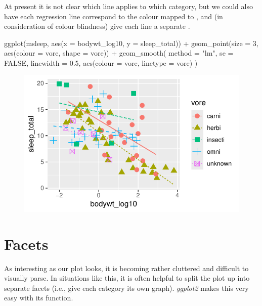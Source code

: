 At present it is not clear which line applies to which category, but we could also have each regression line correspond to the colour mapped to , and (in consideration of colour blindness) give each line a separate .

\begin{inR}
ggplot(msleep, aes(x = bodywt_log10, y = sleep_total)) +
  geom_point(size = 3, aes(colour = vore, shape = vore)) +
  geom_smooth(
    method = "lm",
    se = FALSE,
    linewidth = 0.5,
    aes(colour = vore, linetype = vore)
    )
\end{inR}

\vspace{2em}

\begin{figure}[H]
\includegraphics[scale = 0.75]{graphics/ch2Figs/ggEx_13.pdf}
\end{figure}

\section{Facets}
\label{sec:facets}

As interesting as our plot looks, it is becoming rather cluttered and difficult to visually parse. In situations like this, it is often helpful to split the plot up into separate facets (i.e., give each category its own graph). \textit{ggplot2} makes this very easy with its  function.

